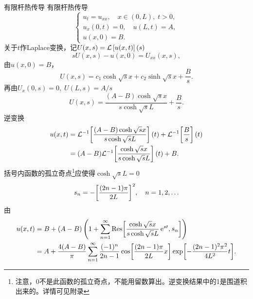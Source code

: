 \begin{example}{有限杆热传导}{}
	有限杆热传导
	\[
		\begin{cases}
			u_t=u_{xx},\quad x\in(0,L),\;t>0,     \\
			u_x(0,t)=0,\quad u(L,t)=A, \\
			u(x,0)=B.
		\end{cases}
	\]
	关于$t$作Laplace变换，记$U(x,s)=\mathcal L\left[u(x,t)\right](s)$
	\[
		s U(x,s)-u(x,0)=U_{xx}(x,s),
	\]
	由$u(x,0)=B$，
	\[
		U(x,s)=c_1\cosh\sqrt s x+c_2\sinh\sqrt s x+\frac Bs.
	\]
	再由$U_x(0,s)=0,\;U(L,s)=A/s$
	\[
		U(x,s)=\frac{(A-B)\cosh\sqrt s x}{s\cosh\sqrt s L}+\frac Bs.
	\]
	逆变换
	\begin{align*}
		u(x,t)&=\mathcal L^{-1}\!\left[\frac{(A-B)\cosh\sqrt s x}{s\cosh\sqrt s L}\right](t)+\mathcal L^{-1}\!\left[\frac Bs\right](t)\\
		&=(A-B)\mathcal L^{-1}\!\left[\frac{\cosh\sqrt s x}{s\cosh\sqrt s L}\right](t)+B.
	\end{align*}
	括号内函数的孤立奇点\footnote{注意，0不是此函数的孤立奇点，不能用留数算出。逆变换结果中的1是围道积出来的。详情可见附录}应使得$\cosh\sqrt s L=0$
	\[
		s_n=-\biggl[\frac{(2n-1)\pi}{2L}\biggr]^2,\quad n=1,2,\ldots
	\]
	由
	\begin{align*}
		u(x,t)&=B+(A-B)\left(1+\sum_{n=1}^\infty\operatorname{Res}\biggl[\frac{\cosh\sqrt s x}{s\cosh\sqrt s L}\mathop{}\!\mathrm{e}^{s t},s_n\biggr]\right)\\
		&=A+\frac{4(A-B)}\pi\sum_{n=1}^\infty\frac{(-1)^n}{2n-1}\cos\biggl[\frac{(2n-1)\pi}{2L}x\biggr]\exp\biggl[-\frac{(2n-1)^2\pi^2}{4L^2}t\biggr].
	\end{align*}
\end{example}
